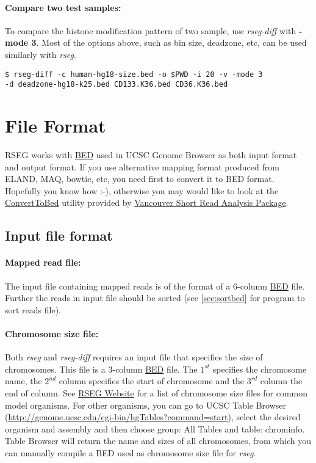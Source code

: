 \documentclass[11pt]{report}
\begin{document}
\paragraph{Compare two test samples:}
To compare the histone modification pattern of two sample, use
\textit{rseg-diff} with \textbf{-mode 3}. Most of the options above, such as bin size,
deadzone, etc, can be used similarly with \textit{rseg}.
\begin{verbatim}
$ rseg-diff -c human-hg18-size.bed -o $PWD -i 20 -v -mode 3 
-d deadzone-hg18-k25.bed CD133.K36.bed CD36.K36.bed
\end{verbatim}

\section{File Format}
\label{sec:file-format}

RSEG works with
\href{http://genome.ucsc.edu/FAQ/FAQformat.html#format1}{BED} used in
UCSC Genome Browser as both input format and output format. If you use
alternative mapping format produced from ELAND, MAQ, bowtie, etc, you
need first to convert it to BED format. Hopefully you know how :-),
otherwise you may would like to look at the
\href{http://sourceforge.net/apps/mediawiki/vancouvershortr/index.php?title=ConvertToBed}
{ConvertToBed} utility provided by
\href{http://sourceforge.net/projects/vancouvershortr/}{Vancouver
  Short Read Analysis Package}.


\subsection{Input file format}
\label{sec:input-file}

\paragraph{Mapped read file:} The input file containing mapped reads
is of the format of a 6-column
\href{http://genome.ucsc.edu/FAQ/FAQformat.html#format1}{BED}
file. Further the reads in input file should be sorted (see
\ref{sec:sortbed} for program to sort reads file).

\paragraph{Chromosome size file:} Both \textit{rseg} and
\textit{rseg-diff} requires an input file that specifies the size of
chromosomes. This file is a 3-column
\href{http://genome.ucsc.edu/FAQ/FAQformat.html#format1}{BED}
file. The $1^{st}$ specifies the chromosome name, the $2^{nd}$ column
specifies the start of chromosome and the $3^{rd}$ column the end of
column. See \href{http://smithlab.cmb.usc.edu/histone/software/}{RSEG
  Website} for a list of chromosome size files for common model
organisms. For other organisms, you can go to UCSC Table Browser
(\url{http://genome.ucsc.edu/cgi-bin/hgTables?command=start}), select
the desired organism and assembly and then choose group: All Tables
and table: chrominfo. Table Browser will return the name and sizes of
all chromosomes, from which you can manually compile a BED used as
chromosome size file for \textit{rseg}.
\end{document}

